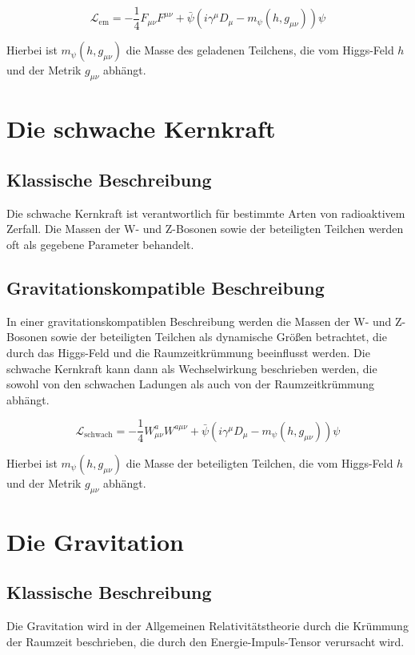 \documentclass{article}
\begin{document}
	\begin{equation}
		\mathcal{L}_\text{em} = -\frac{1}{4} F_{\mu\nu} F^{\mu\nu} + \bar{\psi}(i \gamma^\mu D_\mu - m_\psi(h, g_{\mu\nu}))\psi
	\end{equation}
	
	Hierbei ist $m_\psi(h, g_{\mu\nu})$ die Masse des geladenen Teilchens, die vom Higgs-Feld $h$ und der Metrik $g_{\mu\nu}$ abhängt.
	
	\section{Die schwache Kernkraft}
	
	\subsection{Klassische Beschreibung}
	Die schwache Kernkraft ist verantwortlich für bestimmte Arten von radioaktivem Zerfall. Die Massen der W- und Z-Bosonen sowie der beteiligten Teilchen werden oft als gegebene Parameter behandelt.
	
	\subsection{Gravitationskompatible Beschreibung}
	In einer gravitationskompatiblen Beschreibung werden die Massen der W- und Z-Bosonen sowie der beteiligten Teilchen als dynamische Größen betrachtet, die durch das Higgs-Feld und die Raumzeitkrümmung beeinflusst werden. Die schwache Kernkraft kann dann als Wechselwirkung beschrieben werden, die sowohl von den schwachen Ladungen als auch von der Raumzeitkrümmung abhängt.
	
	\begin{equation}
		\mathcal{L}_\text{schwach} = -\frac{1}{4} W_{\mu\nu}^a W^{a\mu\nu} + \bar{\psi}(i \gamma^\mu D_\mu - m_\psi(h, g_{\mu\nu}))\psi
	\end{equation}
	
	Hierbei ist $m_\psi(h, g_{\mu\nu})$ die Masse der beteiligten Teilchen, die vom Higgs-Feld $h$ und der Metrik $g_{\mu\nu}$ abhängt.
	
	\section{Die Gravitation}
	
	\subsection{Klassische Beschreibung}
	Die Gravitation wird in der Allgemeinen Relativitätstheorie durch die Krümmung der Raumzeit beschrieben, die durch den Energie-Impuls-Tensor verursacht wird.
	
\end{document}
